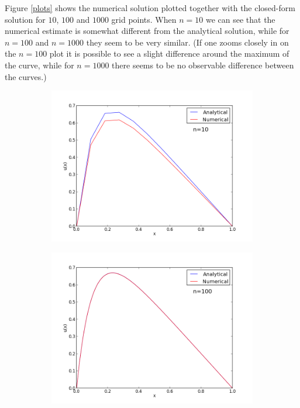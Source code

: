 \documentclass[12pt, a4paper]{article}
\begin{document}
Figure \ref{plots} shows the numerical solution plotted together with the closed-form solution for 
$10$, $100$ and $1000$ grid points. When $n=10$ we can see that the numerical estimate is somewhat 
different from the analytical solution, while for $n=100$ and $n=1000$ they seem to be very similar. 
(If one zooms closely in on the $n=100$ plot it is possible to see a slight difference around the 
maximum of the curve, while for $n=1000$ there seems to be no observable difference between the curves.) 

\begin{figure}[ht!]
  \centering
  \begin{subfigure}[b]{0.495\textwidth}
		\includegraphics[width=\textwidth]{../plot_n_10.png}
        \caption{}
  \end{subfigure}
  \begin{subfigure}[b]{0.495\textwidth}
        \includegraphics[width=\textwidth]{../plot_n_100.png}

\end{subfigure}
\end{figure}
\end{document}
